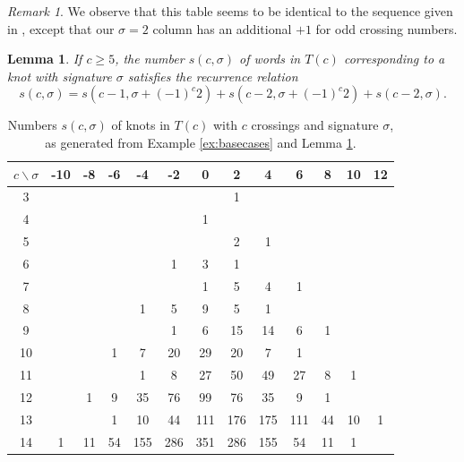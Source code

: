 \documentclass[12pt]{amsart}
\newtheorem{lemma}[theorem]{Lemma}
\theoremstyle{definition}
\theoremstyle{remark}
\newtheorem{remark}[theorem]{Remark}
\numberwithin{equation}{section}
\begin{document}
\begin{remark}
We observe that this table seems to be identical to the sequence given in \cite{OEIS013580}, except that our $\sigma=2$ column has an additional $+1$ for odd crossing numbers.
\end{remark}


\begin{lemma}
\label{lem:signaturerecursion}
If $c\geq 5$, the number $s(c,\sigma)$ of words in $T(c)$ corresponding to a knot with signature $\sigma$ satisfies the recurrence relation
\begin{equation*}
s(c,\sigma)=s(c-1,\sigma+(-1)^c2)+s(c-2,\sigma+(-1)^c2)+s(c-2,\sigma).
\end{equation*}
\end{lemma}

\begin{table}[h!]
\begin{tabular}{c|cccc|c|c|c|ccccc}
$c\backslash\sigma$ & -10 & -8 & -6 & -4 & -2 & 0 & 2 & 4 & 6 & 8 & 10 & 12 \\
\hline
3 &   &   &   &  &  &  & 1 &  &  &  &  &  \\
4 &   &   &   &  &  & 1 &  &  &  &  &  &  \\
5 &   &   &   &  &  &  & 2 & 1 &  &  &  &  \\
6 &  &  &  &   & 1 & 3 & 1 &  &  &  &  &  \\
7 &  &  &  &  &  & 1 & 5 & 4 & 1 &  &  &  \\
8 &  &  &  & 1 & 5 & 9 & 5 & 1 &  &  &  &  \\
9 &  &  &  &  & 1 & 6 & 15 & 14 & 6 & 1 &  &  \\
10 &  &  & 1 & 7 & 20 & 29 & 20 & 7 & 1 &  &  &  \\
11 &  &  &  & 1 & 8 & 27 & 50 & 49 & 27 & 8 & 1 &  \\
12 &  & 1 & 9 & 35 & 76 & 99 & 76 & 35 & 9 & 1 &  &  \\
13 &  &  & 1 & 10 & 44 & 111 & 176 & 175 & 111 & 44 & 10 & 1 \\
14 & 1 & 11 & 54 & 155 & 286 & 351 & 286 & 155 & 54 & 11 & 1 & 
\end{tabular}
\caption{Numbers $s(c,\sigma)$ of knots in $T(c)$ with $c$ crossings and signature $\sigma$, as generated from Example \ref{ex:basecases} and Lemma \ref{lem:signaturerecursion}.}
\label{tab:sig}
\end{table}
\end{document}
